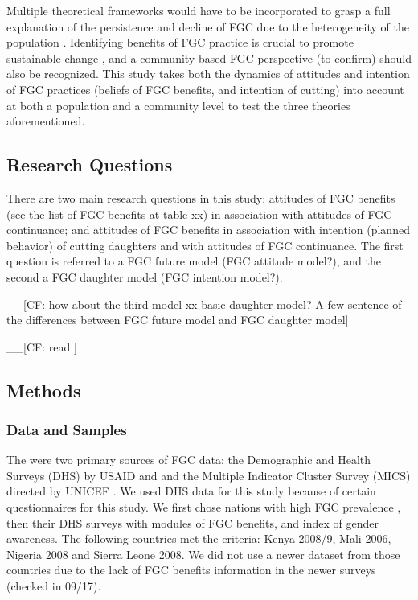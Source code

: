 \documentclass[12pt,]{article}
\begin{document}
Multiple theoretical frameworks would have to be incorporated to grasp a full explanation of the persistence and decline of FGC due to the heterogeneity of the population \cite{Hayf05, EffeVogt15, ModrLiu13}.  Identifying benefits of FGC practice is crucial to promote sustainable change \cite{EffeVogt15}, and a community-based FGC perspective \cite{BoylCorl010, Drol11,Hayf05, Grue05, Hodg11, KandNwak09, OdukAfol17} (to confirm) should also be recognized.  This study takes both the dynamics of attitudes and intention of FGC practices (beliefs of FGC benefits, and intention of cutting) into account at both a population and a community level to test the three theories aforementioned.

\subsection{Research Questions}\label{research-questions}
There are two main research questions in this study:  attitudes of FGC benefits (see the list of FGC benefits at table xx) in association with attitudes of FGC continuance; and attitudes of FGC benefits in association with intention (planned behavior) of cutting daughters and with attitudes of FGC continuance.  The first question is referred to a FGC future model (FGC attitude model?), and the second a FGC daughter model (FGC intention model?). 

\_\_{[}CF: how about the third model xx basic daughter model?  A few sentence of the differences between FGC future model and FGC daughter model{]}

\_\_{[}CF: read \cite{Aske05, Brue05}{]}

\subsection{Methods}\label{methods}

\subsubsection{Data and Samples}\label{data-and-samples}

The were two primary sources of FGC data: the Demographic and Health Surveys (DHS) by USAID and and the Multiple Indicator Cluster Survey (MICS) directed by UNICEF \cite{CappMone13, YodeWang13}. We used DHS data for this study because of certain questionnaires for this study.  We first chose nations with high FGC prevalence \cite{UNIC16}, then their DHS surveys with modules of FGC benefits, and index of gender awareness.  The following countries met the criteria:  Kenya 2008/9, Mali 2006, Nigeria 2008 and Sierra Leone 2008.  We did not use a newer dataset from those countries due to the lack of FGC benefits information in the newer surveys (checked in 09/17).
\end{document}

